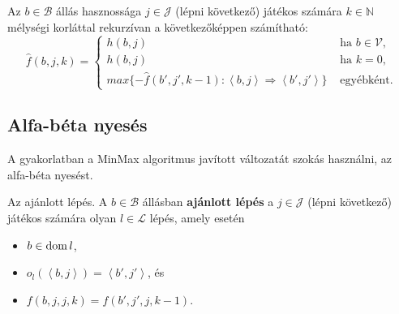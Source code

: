Az $b \in \mathcal{B}$ állás hasznossága $j \in \mathcal{J}$ (lépni következő)
játékos számára $k \in \mathbb{N}$ mélységi korláttal rekurzívan a következőképpen
számítható: \[
    \hat{f} (b, j, k) = \begin{cases}
        h(b,j) & \text{ ha } b \in \mathcal{V},\\
        h(b,j) & \text{ ha } k = 0,\\
        max \{
            -\hat{f}(b', j', k-1) : \left<b,j \right> \Rightarrow \left<b',j' \right>
        \}
               & \text{ egyébként.}
    \end{cases}
\]

\subsection{Alfa-béta nyesés}

A gyakorlatban a MinMax algoritmus javított változatát szokás használni, az
alfa-béta nyesést.

\begin{definicio}
    Az ajánlott lépés.  A $b \in \mathcal{B}$ állásban {\bf ajánlott lépés} a
    $j \in \mathcal{J}$
    (lépni következő) játékos számára olyan $l \in \mathcal{L}$ lépés, amely esetén
    \begin{itemize}
        \item $b \in \operatorname{dom} l$,
        \item $o_l\left(\left<b,j \right> \right) = \left<b', j' \right>$, és
        \item $f(b,j,j,k) = f(b', j', j, k-1)$.
    \end{itemize}
\end{definicio}
